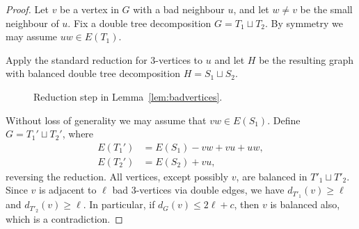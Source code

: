 \documentclass[11pt, reqno, a4paper]{article}
\theoremstyle{definition}
\numberwithin{equation}{section}
\renewcommand{\leq}{\leqslant}
\renewcommand{\geq}{\geqslant}
\begin{document}
\begin{proof}
Let $v$ be a vertex in $G$ with a bad neighbour $u$, and let $w\neq v$ be the small neighbour of $u$.
Fix a double tree decomposition $G=T_1\sqcup T_2$.
By symmetry we may assume $uw\in E(T_1)$.

Apply the standard reduction for $3$-vertices to $u$ and let $H$ be the resulting graph with balanced double tree decomposition $H=S_1\sqcup S_2$.
\begin{figure}[ht]
	\centering
	\caption{Reduction step in Lemma~\ref{lem:badvertices}.}
\end{figure}
Without loss of generality we may assume that $vw\in E(S_1)$.
Define $G= T_1'\sqcup T_2'$, where
\begin{align*}
E(T_1') &= E(S_1) - vw + vu + uw,\\
E(T_2') &= E(S_2) + vu,
\end{align*}
reversing the reduction. All vertices, except possibly $v$, are balanced in $T'_1 \sqcup T'_2$.
Since $v$ is adjacent to $\ell$ bad $3$-vertices via double edges, we have $d_{T'_1}(v) \geq \ell$ and $d_{T'_2}(v)\geq \ell$. In particular, if $d_G(v) \leq 2\ell + c$, then $v$ is balanced also, which is a contradiction.
\end{proof}
\end{document}
